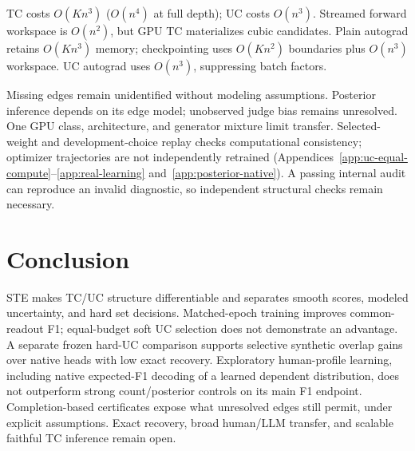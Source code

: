 TC costs $O(Kn^3)$ ($O(n^4)$ at full depth); UC costs $O(n^3)$. Streamed forward workspace is $O(n^2)$, but GPU TC materializes cubic candidates. Plain autograd retains $O(Kn^3)$ memory; checkpointing uses $O(Kn^2)$ boundaries plus $O(n^3)$ workspace. UC autograd uses $O(n^3)$, suppressing batch factors.

Missing edges remain unidentified without modeling assumptions. Posterior inference depends on its edge model; unobserved judge bias remains unresolved. One GPU class, architecture, and generator mixture limit transfer. Selected-weight and development-choice replay checks computational consistency; optimizer trajectories are not independently retrained (Appendices~\ref{app:uc-equal-compute}--\ref{app:real-learning} and~\ref{app:posterior-native}). A passing internal audit can reproduce an invalid diagnostic, so independent structural checks remain necessary.

\section{Conclusion}\label{sec:conclusion}
STE makes TC/UC structure differentiable and separates smooth scores, modeled uncertainty, and hard set decisions. Matched-epoch training improves common-readout F1; equal-budget soft UC selection does not demonstrate an advantage. A separate frozen hard-UC comparison supports selective synthetic overlap gains over native heads with low exact recovery. Exploratory human-profile learning, including native expected-F1 decoding of a learned dependent distribution, does not outperform strong count/posterior controls on its main F1 endpoint. Completion-based certificates expose what unresolved edges still permit, under explicit assumptions. Exact recovery, broad human/LLM transfer, and scalable faithful TC inference remain open.
